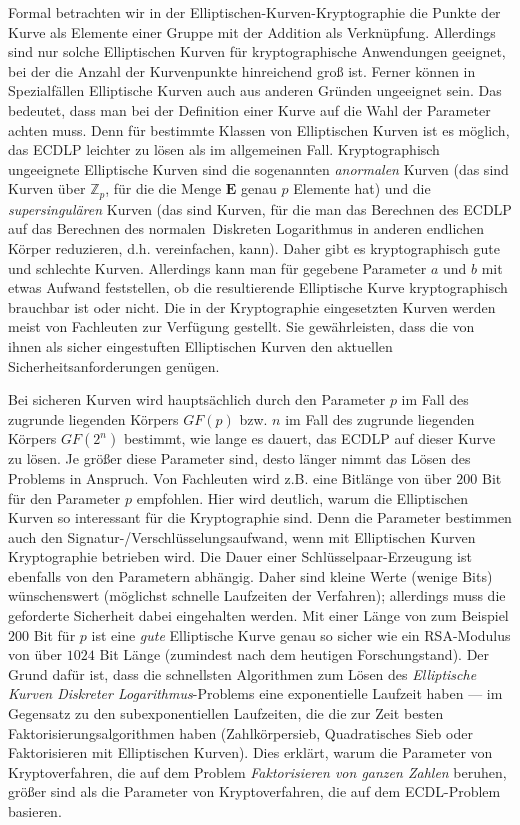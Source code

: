 \begin{refsegment}
Formal betrachten wir in der Elliptischen-Kurven-Kryptographie die Punkte der Kurve als Elemente einer Gruppe mit der Addition als Verknüpfung. Allerdings sind nur solche Elliptischen Kurven für kryptographische Anwendungen geeignet, bei der die Anzahl der Kurvenpunkte hinreichend groß ist. Ferner können in Spezialfällen Elliptische Kurven auch aus anderen Gründen ungeeignet sein. Das bedeutet, dass man bei der
Definition einer Kurve auf die Wahl der Parameter achten muss. Denn für bestimmte Klassen von
Elliptischen Kurven ist es möglich, das ECDLP leichter zu lösen als im allgemeinen Fall. Kryptographisch
ungeeignete Elliptische Kurven sind die sogenannten {\em anormalen} Kurven (das sind Kurven über ${\mathbb Z}_p$,
für die die Menge $\textbf{E}$ genau $p$ Elemente hat) und die {\em supersingulären} Kurven (das sind Kurven, für die man das
Berechnen des ECDLP auf das Berechnen des \glqq normalen\grqq\ Diskreten Logarithmus in anderen endlichen Körper
reduzieren, d.h. vereinfachen, kann). Daher gibt es kryptographisch gute und schlechte Kurven. Allerdings
kann man für gegebene Parameter $a$ und $b$ mit etwas Aufwand feststellen, ob die resultierende Elliptische
Kurve kryptographisch brauchbar ist oder nicht. Die in der Kryptographie eingesetzten Kurven werden meist
von Fachleuten zur Verfügung gestellt. Sie gewährleisten, dass die von ihnen als sicher eingestuften
Elliptischen Kurven den aktuellen Sicherheitsanforderungen genügen.

Bei sicheren Kurven wird hauptsächlich
durch den Parameter $p$ im Fall des zugrunde liegenden Körpers $GF(p)$ bzw. $n$ im Fall des zugrunde liegenden Körpers $GF(2^n)$ bestimmt, wie lange es dauert, das ECDLP auf dieser Kurve zu lösen. Je größer diese
Parameter sind, desto länger nimmt das Lösen des Problems in Anspruch. Von Fachleuten wird z.B. eine Bitlänge
von über $200$ Bit für den Parameter $p$ empfohlen. Hier wird deutlich, warum die Elliptischen Kurven so
interessant für die Kryptographie sind. Denn die Parameter bestimmen auch den
Signatur-/Verschlüsselungsaufwand, wenn mit Elliptischen Kurven
Kryptographie betrieben wird. Die Dauer einer Schlüsselpaar-Erzeugung ist ebenfalls von den Parametern abhängig. Daher sind kleine Werte (wenige Bits) wünschenswert (möglichst schnelle Laufzeiten der Verfahren);
allerdings muss die geforderte Sicherheit dabei eingehalten werden.
Mit einer Länge von zum Beispiel $200$ Bit für $p$ ist eine {\em gute} Elliptische Kurve
genau so sicher wie ein  RSA-Modulus von über $1024$ Bit Länge
(zumindest nach dem heutigen Forschungstand). Der Grund dafür ist, dass die schnellsten
Algorithmen zum Lösen des {\em Elliptische Kurven Diskreter Logarithmus}-Problems eine
exponentielle Laufzeit haben --- im Gegensatz zu den subexponentiellen Laufzeiten, die
die zur Zeit besten Faktorisierungsalgorithmen haben (Zahlkörpersieb, Quadratisches Sieb
oder Faktorisieren mit Elliptischen Kurven). Dies erklärt, warum die Parameter von
Kryptoverfahren, die auf dem Problem {\em Faktorisieren von ganzen Zahlen} beruhen,
größer sind als die Parameter von Kryptoverfahren, die auf dem ECDL-Problem basieren.



\end{refsegment}
